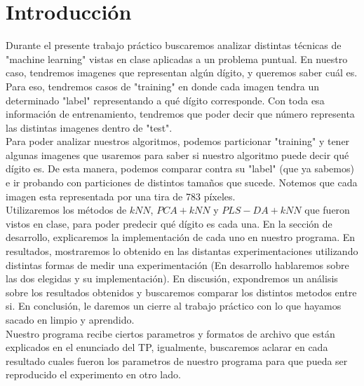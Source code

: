 \section{Introducción}

Durante el presente trabajo pr\'actico buscaremos analizar distintas t\'ecnicas de "machine learning" vistas en clase aplicadas a un problema puntual. En nuestro caso, tendremos imagenes que representan alg\'un d\'igito, y queremos saber cu\'al es. Para eso, tendremos casos de "training" en donde cada imagen tendra un determinado "label" representando a qu\'e d\'igito corresponde. Con toda esa informaci\'on de entrenamiento, tendremos que poder decir que n\'umero representa las distintas imagenes dentro de "test".\\

Para poder analizar nuestros algoritmos, podemos particionar "training" y tener algunas imagenes que usaremos para saber si nuestro algoritmo puede decir qu\'e d\'igito es. De esta manera, podemos comparar contra su "label" (que ya sabemos) e ir probando con particiones de distintos tama\~nos que sucede. Notemos que cada imagen esta representada por una tira de 783 p\'ixeles.\\

Utilizaremos los m\'etodos de $kNN$, $PCA + kNN$ y $PLS-DA + kNN$ que fueron vistos en clase, para poder predecir qu\'e d\'igito es cada una. En la secci\'on de desarrollo, explicaremos la implementaci\'on de cada uno en nuestro programa. En resultados, mostraremos lo obtenido en las distantas experimentaciones utilizando distintas formas de medir una experimentaci\'on (En desarrollo hablaremos sobre las dos elegidas y su implementaci\'on). En discusi\'on, expondremos un an\'alisis sobre los resultados obtenidos y buscaremos comparar los distintos metodos entre si. En conclusi\'on, le daremos un cierre al trabajo pr\'actico con lo que hayamos sacado en limpio y aprendido.\\

Nuestro programa recibe ciertos parametros y formatos de archivo que est\'an explicados en el enunciado del TP, igualmente, buscaremos aclarar en cada resultado cuales fueron los parametros de nuestro programa para que pueda ser reproducido el experimento en otro lado.